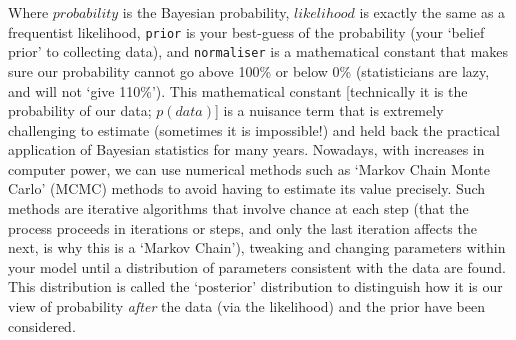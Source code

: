 \documentclass[11pt]{article}
\begin{document}
{Where $probability$ is the Bayesian probability, $likelihood$ is exactly the same as a frequentist likelihood, \texttt{prior} is your best-guess of the probability (your `belief prior' to collecting data), and \texttt{normaliser} is a mathematical constant that makes sure our probability cannot go above 100\% or below 0\% (statisticians are lazy, and will not `give 110\%'). This mathematical constant [technically it is the probability of our data; $p(data)$] is a nuisance term that is extremely challenging to estimate (sometimes it is impossible!) and held back the practical application of Bayesian statistics for many years. Nowadays, with increases in computer power, we can use numerical methods such as `Markov Chain Monte Carlo' (MCMC) methods to avoid having to estimate its value precisely. Such methods are iterative algorithms  that involve chance at each step (that the process proceeds in iterations or steps, and only the last iteration affects the next, is why this is a `Markov Chain'), tweaking and changing parameters within your model until a distribution of parameters consistent with the data are found. This distribution is called the `posterior' distribution to distinguish how it is our view of probability \emph{after} the data (via the likelihood) and the prior have been considered. %



}
\end{document}
